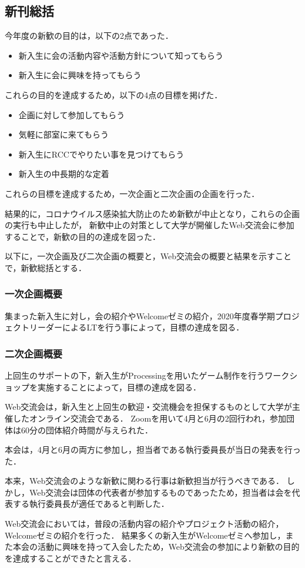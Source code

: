 \subsection*{新刊総括}


今年度の新歓の目的は，以下の2点であった．

\begin{itemize}
    \item 新入生に会の活動内容や活動方針について知ってもらう
    \item 新入生に会に興味を持ってもらう
\end{itemize}

これらの目的を達成するため，以下の4点の目標を掲げた．

\begin{itemize}
    \item 企画に対して参加してもらう
    \item 気軽に部室に来てもらう
    \item 新入生にRCCでやりたい事を見つけてもらう
    \item 新入生の中長期的な定着
\end{itemize}

これらの目標を達成するため，一次企画と二次企画の企画を行った．

結果的に，コロナウイルス感染拡大防止のため新歓が中止となり，これらの企画の実行も中止したが，
新歓中止の対策として大学が開催したWeb交流会に参加することで，新歓の目的の達成を図った．

以下に，一次企画及び二次企画の概要と，Web交流会の概要と結果を示すことで，新歓総括とする．

\subsubsection*{一次企画概要}
集まった新入生に対し，会の紹介やWelcomeゼミの紹介，2020年度春学期プロジェクトリーダーによるLTを行う事によって，目標の達成を図る．

\subsubsection*{二次企画概要}
上回生のサポートの下，新入生がProcessingを用いたゲーム制作を行うワークショップを実施することによって，目標の達成を図る．

Web交流会は，新入生と上回生の歓迎・交流機会を担保するものとして大学が主催したオンライン交流会である．
Zoomを用いて4月と6月の2回行われ，参加団体は60分の団体紹介時間が与えられた．

本会は，4月と6月の両方に参加し，担当者である執行委員長が当日の発表を行った．

本来，Web交流会のような新歓に関わる行事は新歓担当が行うべきである．
しかし，Web交流会は団体の代表者が参加するものであったため，担当者は会を代表する執行委員長が適任であると判断した．

Web交流会においては，普段の活動内容の紹介やプロジェクト活動の紹介，Welcomeゼミの紹介を行った．
結果多くの新入生がWelcomeゼミへ参加し，また本会の活動に興味を持って入会したため，Web交流会の参加により新歓の目的を達成することができたと言える．
